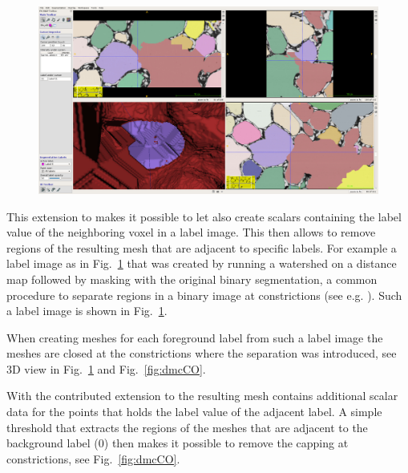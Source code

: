 \documentclass{InsightArticle}
\begin{document}
\begin{figure}[!b]
\center
\includegraphics[width=\textwidth]{images/vtkDiscreteMarchingCubes_extension_07}
\label{fig:labelimage}
\end{figure}


This extension to  makes it possible to let  also create  scalars containing the label value of the neighboring voxel in a label image. This then allows to remove regions of the resulting mesh that are adjacent to specific labels. For example a label image as in Fig.~\ref{fig:labelimage} that was created by running a watershed on a distance map followed by masking with the original binary segmentation, a common procedure to separate regions in a binary image at constrictions (see e.g. \citet{Beare2006b}). Such a label image is shown in Fig.~\ref{fig:labelimage}.

When creating meshes for each foreground label from such a label image the meshes are closed at the constrictions where the separation was introduced, see 3D view in Fig.~\ref{fig:labelimage} and Fig.~\ref{fig:dmcCO}.

With the contributed extension to  the resulting mesh contains additional scalar data for the points that holds the label value of the adjacent label. A simple threshold that extracts the regions of the meshes that are adjacent to the background label (0) then makes it possible to remove the capping at constrictions, see Fig.~\ref{fig:dmcCO}.
\end{document}
